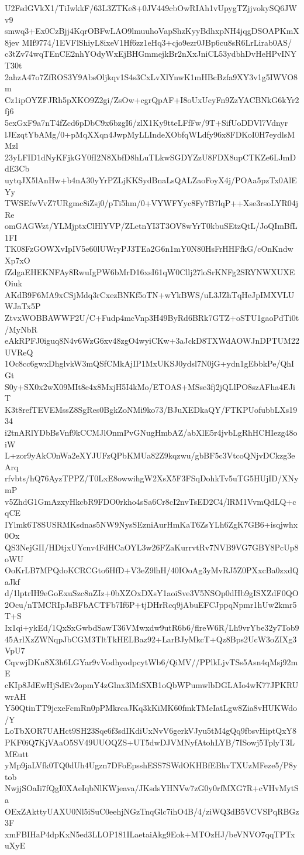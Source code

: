 U2FsdGVkX1/TiIwkkF/63L3ZTKe8+0JV449cbOwRIAh1vUpygTZjjvokySQ6JWv9
smwq3+Ex0CzBjj4KqrOBFwLAO9lmuuhoVapShzKyyBdhxpNH4jqgDSOAPKmX8jev
MIf9774/1EVFlShiyL8ixeV1Hf6zz1eHq3+cjo9ezr0JBp6cu8sR6LrLirab0AS/
c3tZv74wqTEnCE2nhYOdyWxEjBHGmmejkBr2nXxJniCL53ydbhDvHeHPvINYT30t
2ahzA47o7ZfROS3Y9AbsOljkqv1S4s3CxLvXlYnwK1mHBcBzfa9XY3v1g5IWVO8m
Cz1ipOYZFJRh5pXKO9Z2gi/ZsOw+cgrQpAF+I8oUxUcyFn9ZzYACBNkG6kYr2fj6
5exGxF9a7nT4fZcd6pDbC9x6bzgI6/zlX1Ky9tteLFfFw/9T+SifUoDDVl7Vdnyr
lJEzqtYbAMg/0+pMqXXqn4JwpMyLLIndeXObfqWLdfy96x8FDKoI0H7eydlsMMzl
23yLFID1dNyKFjkGY0fI2N8XbfD8hLuTLkwSGDYZzU8FDX8upCTKZe6LJmDdE3Cb
uytqJX5lAnHw+b4nA30yYrPZLjKKSydBnaLsQALZaoFoyX4j/POAa5pzTx0AlEYy
TWSEfwVvZ7URgmc8iZsj0/pTi5hm/0+VYWFYyc8Fy7B7lqP++Xse3rsoLYR04jRe
omGAGWzt/YLMjptxClHlYVP/ZLetnYI3T3OV8wYrT0kbuSEtzQtL/JoQImBfL1FI
TK08FzGOWXvIpIV5e60lUWryPJ3TEa2G6n1mY0N80HsFrHHFfkG/cOnKndwXp7xO
fZdgaEHEKNFAy8RwuIgPW6bMrD16xsI61qW0Cllj27loSrKNFg2SRYNWXUXEOiuk
AKdB9F6MA9xCSjMdq3rCxezBNKf5oTN+wYkBWS/uL3JZhTqHeJpIMXVLUWJaTx5P
ZtvxWOBBAWWF2U/C+Fudp4mcVnp3H49ByRd6BRk7GTZ+oSTU1gaoPdTi0t/MyNbR
eAkRPFJ0iguq8N4v6WzG6xv48zgO4wyiCKw+3aJckD8TXWdAOWJnDPTUM22UVReQ
1Oc8cc6gwxDhglvkW3mQSfCMkAjIP1MxUKSJ0ydsl7N0jG+ydn1gEbbkPe/QhIGt
S0y+SX0x2wX09MIt8e4x8MxjH5I4kMo/ETOAS+MSse3fj2jQLlPO8szAFha4EJiT
K3t8refTEVEMssZ8SgRes0BgkZoNMi9ko73/BJuXEDkaQY/FTKPUofubbLXs1934
i2tnARlYDbBsVnf9kCCMJlOnmPvGNugHmbAZ/abXlE5r4jvbLgRhHCHIezg48oiW
L+zor9yAkC0nWa2eXYJUFzQPbKMUa82Z9kqzwu/gbBF5c3VtcoQNjvDCkzg3eArq
rfvbts/hQ76AyzTPPZ/T0LxE8owwihgW2XsX5F3FSqDohkTv5uTG5HUjID/XNymP
v5ZhdG1GmAzxyHkcbR9FDO0rkho4sSa6Cr8cI2nvTsED2C4/lRM1VvmQdLQ+cqCE
IYlmk6T8SUSRMKsdnas5NW9NysSEzniAurHmKaT6ZsYLh6ZgK7GB6+isqjwhx0Ox
QS3NejGII/HDtjxUYcnv4FdHCaOYL3w26FZaKurrvtRv7NVB9VG7GBY8PcUp8oWU
OoKrLB7MPQdoKCRCGto6HfD+V3eZ9lhH/40IOoAg3yMvRJ5Z0PXxcBa0zxdQaJkf
d/1lptrIH9eGoExuSzc8nZIz+0bXZOxDXsY1aoiSve3V5NSOp0dHb9gISXZdF0QO
2Ocu/nTMCRIpJsBFbACTFb7If6P+tjDHrRcq9jAbuEFCJppqNpmr1hUw2kmr5T+S
Ix1qi+ykEd/1QxSxGwbdSawT36VMwxdw9utR6b6/flreW6R/Lh9vrYbe32y7Tob9
45ArlXzZWNqpJbCGM3TltTkHELBaz92+LarBJyMkcT+Qz8Bps2UcW3oZIXg3VpU7
CqvwjDKn8X3h6LGYar9vVodhyodpcytWb6/QiMV//PPlkLjvTSs5Asn4qMsj92mE
cKIp8JdEwHjSdEv2opmY4zGlnx3lMiSXB1oQbWPumwlbDGLAIo4wK77JPKRUwrAH
Y50QtinTT9jcxeFcmRn0pPMkrcaJKq3kKiMK60fmkTMeIatLgw8Zia8vHUKWdo/Y
LoTbXOR7UAHct9SH23Sqe6f3sdIKdiUxNvV6gerkVJyu5tM4gQq9fbsvHiptQxY8
PKF0iQ7KjVAaO5SV49UUOQZS+UT5dwDJVMNyfAtohLYB/7ISowj5TplyT3LMEutt
yMp9jaLVfk0TQ0dUh4Ugzn7DFoEpsshESS7SWdOKHBfEBhvTXUzMFeze5/P8ytob
NwjjSOaIi7fQgI0XAeIqbNlKWjeava/JKsdsYHNVw7zG0y0rfMXG7R+cVHvMytSa
OExZAkttyUAXU0Nl5iSuC0eehjNGzTnqGlc7ihO4B/4/ziWQ3dB5VCVSPqRBGz3F
xmFBIHaP4dpKxN5ed3LLOP181ILaetaiAkg9Eok+MTOzHJ/beVNVO7qqTPTxuXyE
